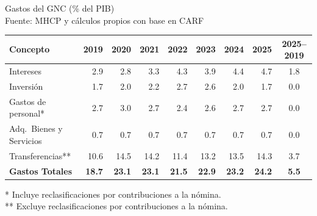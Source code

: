 \begin{frame}{Gastos del GNC (\% del PIB) \\ \small{Fuente: MHCP y cálculos propios con base en CARF}}
\footnotesize
\centering
\setlength{\tabcolsep}{4pt}
\begin{tabular}{l|rrrrrrr|c}
\hline
\textbf{Concepto} & \textbf{2019} & \textbf{2020} & \textbf{2021} & \textbf{2022} & \textbf{2023} & \textbf{2024} & \textbf{2025} & \textbf{2025--2019} \\
\hline
Intereses                &  2.9 &  2.8 &  3.3 &  4.3 &  3.9 &  4.4 &  4.7 & 1.8 \\
Inversi\'on              &  1.7 &  2.0 &  2.2 &  2.7 &  2.6 &  2.0 &  1.7 & 0.0 \\
Gastos de personal*      &  2.7 &  3.0 &  2.7 &  2.4 &  2.6 &  2.7 &  2.7 & 0.0 \\
Adq.\ Bienes y Servicios &  0.7 &  0.7 &  0.7 &  0.7 &  0.7 &  0.7 &  0.7 & 0.0 \\
Transferencias**         & 10.6 & 14.5 & 14.2 & 11.4 & 13.2 & 13.5 & 14.3 & 3.7 \\
\hline
\textbf{Gastos Totales}           & \textbf{18.7} & \textbf{23.1} & \textbf{23.1} & \textbf{21.5} & \textbf{22.9} & \textbf{23.2} & \textbf{24.2} & \textbf{5.5} \\ \hline
\end{tabular}

\vspace{2mm}
\begin{flushleft}\footnotesize
* Incluye reclasificaciones por contribuciones a la n\'omina.\\
** Excluye reclasificaciones por contribuciones a la n\'omina.
\end{flushleft}
\end{frame}
